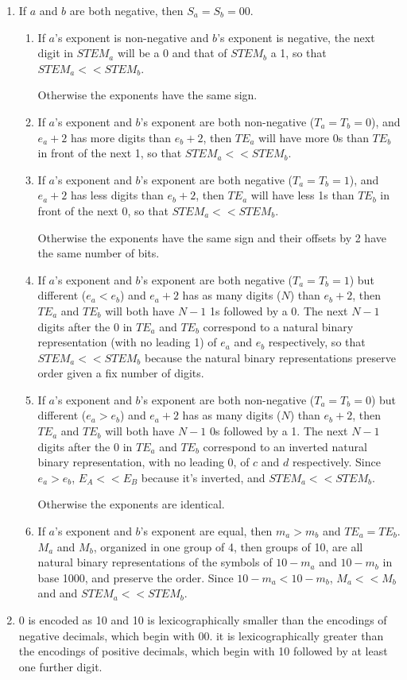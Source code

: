 \documentclass{acm_proc_article-sp}
\begin{document}
\begin{enumerate}
\item If $a$ and $b$ are both negative, then $S_a=S_b=00$.
  \begin{enumerate}
  \item If $a$'s exponent is non-negative and $b$'s exponent is negative, the next digit in $STEM_a$ will be a 0 and that of $STEM_b$ a 1, so that $STEM_a << STEM_b$.

  Otherwise the exponents have the same sign.
  \item If $a$'s exponent and $b$'s exponent are both non-negative ($T_a=T_b=0$), and $e_a+2$ has more digits than $e_b+2$, then $TE_a$ will have more 0s than $TE_b$ in front of the next 1, so that $STEM_a << STEM_b$.
  \item If $a$'s exponent and $b$'s exponent are both negative ($T_a=T_b=1$), and $e_a+2$ has less digits than $e_b+2$, then $TE_a$ will have less 1s than $TE_b$ in front of the next 0, so that $STEM_a << STEM_b$.

  Otherwise the exponents have the same sign and their offsets by 2 have the same number of bits.
  \item If $a$'s exponent and $b$'s exponent are both negative ($T_a=T_b=1$) but different ($e_a < e_b$) and $e_a+2$ has as many digits ($N$) than $e_b+2$, then $TE_a$ and $TE_b$ will both have $N-1$ 1s followed by a 0. The next $N-1$ digits after the 0 in $TE_a$ and $TE_b$ correspond to a natural binary representation (with no leading 1) of $e_a$ and $e_b$ respectively, so that $STEM_a << STEM_b$ because the natural binary representations preserve order given a fix number of digits.
  \item If $a$'s exponent and $b$'s exponent are both non-negative ($T_a=T_b=0$) but different ($e_a > e_b$) and $e_a+2$ has as many digits ($N$) than $e_b+2$, then $TE_a$ and $TE_b$ will both have $N-1$ 0s followed by a 1. The next $N-1$ digits after the 0 in $TE_a$ and $TE_b$ correspond to an inverted natural binary representation, with no leading 0, of $c$ and $d$ respectively. Since $e_a > e_b$, $E_A << E_B$ because it's inverted, and $STEM_a << STEM_b$.

  Otherwise the exponents are identical.
  \item If $a$'s exponent and $b$'s exponent are equal, then $m_a > m_b$ and $TE_a=TE_b$. $M_a$ and $M_b$, organized in one group of 4, then groups of 10, are all natural binary representations of the symbols of $10-m_a$ and $10-m_b$ in base 1000, and preserve the order. Since $10-m_a < 10-m_b$, $M_a<<M_b$ and and $STEM_a << STEM_b$.
  \end{enumerate}
\item 0 is encoded as 10 and 10 is lexicographically smaller than the encodings of negative decimals, which begin with 00. it is lexicographically greater than the encodings of positive decimals, which begin with 10 followed by at least one further digit.
\end{enumerate}
\end{document}
